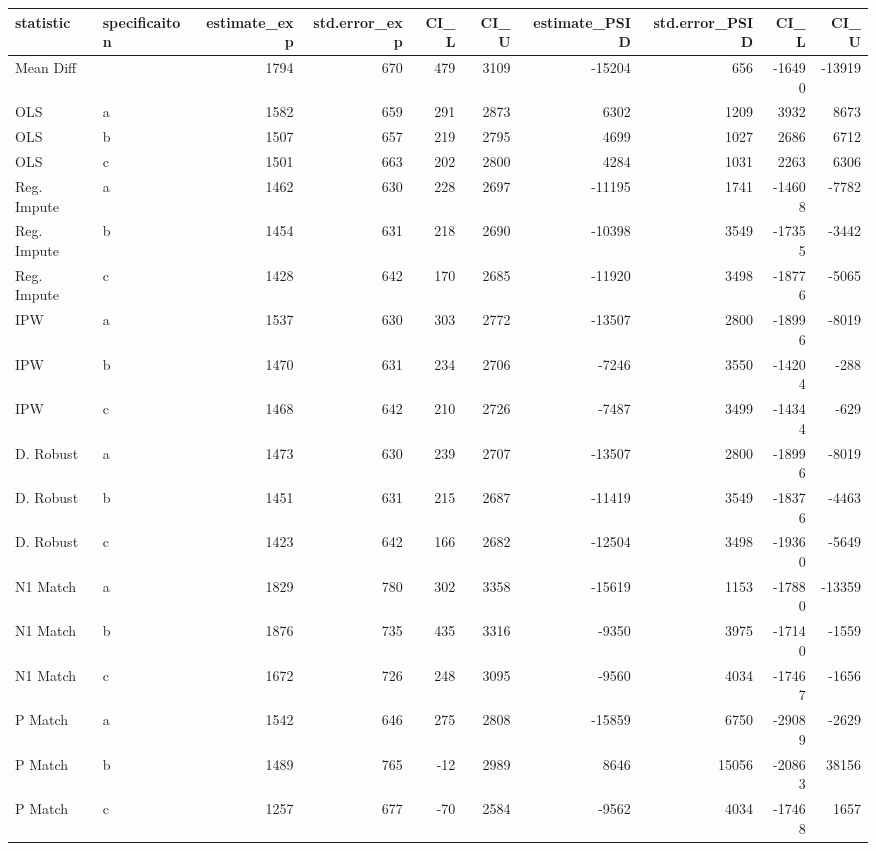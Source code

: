 \begin{tabular}{llrrrrrrrr}
  \hline
statistic & specificaiton & estimate\_exp & std.error\_exp & CI\_L & CI\_U & estimate\_PSID & std.error\_PSID & CI\_L & CI\_U \\ 
  \hline
Mean Diff &  & 1794 & 670 & 479 & 3109 & -15204 & 656 & -16490 & -13919 \\ 
  OLS & a & 1582 & 659 & 291 & 2873 & 6302 & 1209 & 3932 & 8673 \\ 
  OLS & b & 1507 & 657 & 219 & 2795 & 4699 & 1027 & 2686 & 6712 \\ 
  OLS & c & 1501 & 663 & 202 & 2800 & 4284 & 1031 & 2263 & 6306 \\ 
  Reg. Impute & a & 1462 & 630 & 228 & 2697 & -11195 & 1741 & -14608 & -7782 \\ 
  Reg. Impute & b & 1454 & 631 & 218 & 2690 & -10398 & 3549 & -17355 & -3442 \\ 
  Reg. Impute & c & 1428 & 642 & 170 & 2685 & -11920 & 3498 & -18776 & -5065 \\ 
  IPW & a & 1537 & 630 & 303 & 2772 & -13507 & 2800 & -18996 & -8019 \\ 
  IPW & b & 1470 & 631 & 234 & 2706 & -7246 & 3550 & -14204 & -288 \\ 
  IPW & c & 1468 & 642 & 210 & 2726 & -7487 & 3499 & -14344 & -629 \\ 
  D. Robust & a & 1473 & 630 & 239 & 2707 & -13507 & 2800 & -18996 & -8019 \\ 
  D. Robust & b & 1451 & 631 & 215 & 2687 & -11419 & 3549 & -18376 & -4463 \\ 
  D. Robust & c & 1423 & 642 & 166 & 2682 & -12504 & 3498 & -19360 & -5649 \\ 
  N1 Match & a & 1829 & 780 & 302 & 3358 & -15619 & 1153 & -17880 & -13359 \\ 
  N1 Match & b & 1876 & 735 & 435 & 3316 & -9350 & 3975 & -17140 & -1559 \\ 
  N1 Match & c & 1672 & 726 & 248 & 3095 & -9560 & 4034 & -17467 & -1656 \\ 
  P Match & a & 1542 & 646 & 275 & 2808 & -15859 & 6750 & -29089 & -2629 \\ 
  P Match & b & 1489 & 765 & -12 & 2989 & 8646 & 15056 & -20863 & 38156 \\ 
  P Match & c & 1257 & 677 & -70 & 2584 & -9562 & 4034 & -17468 & 1657 \\ 
   \hline
\end{tabular}

